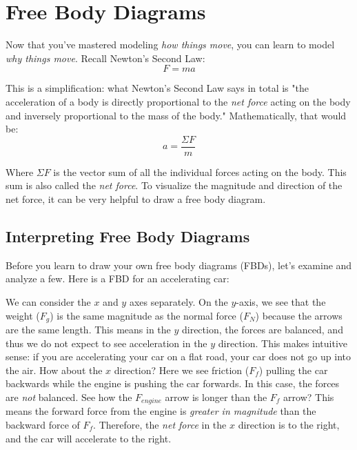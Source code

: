 \chapter{Free Body Diagrams}

Now that you've mastered modeling \textit{how things move}, you can learn to 
model \textit{why things move}. Recall Newton's Second Law:
$$F = ma$$

This is a simplification: what Newton's Second Law says in total is "the 
acceleration of a body is directly proportional to the \textit{net force} 
acting on the body and inversely proportional to the mass of the body." 
Mathematically, that would be:
$$a = \frac{\Sigma F}{m}$$

Where $\Sigma F$ is the vector sum of all the individual forces acting on the 
body. This sum is also called the \textit{net force}. To visualize the magnitude 
and direction of the net force, it can be very helpful to draw a free body 
diagram. 

\section{Interpreting Free Body Diagrams}
Before you learn to draw your own free body diagrams (FBDs), let's examine and 
analyze a few. Here is a FBD for an accelerating car:

\begin{center}
\end{center}

We can consider the $x$ and $y$ axes separately. On the $y$-axis, we see that 
the weight ($F_g$) is the same magnitude as the normal force ($F_N$) because the arrows are the same length. This 
means in the $y$ direction, the forces are balanced, and thus we do not expect 
to see acceleration in the $y$ direction. This makes intuitive sense: if you are 
accelerating your car on a flat road, your car does not go up into the air. How 
about the $x$ direction? Here we see friction ($F_f$) pulling the car backwards 
while the engine is pushing the car forwards. In this case, the forces are 
\textit{not} balanced. See how the $F_{engine}$ arrow is longer than the $F_f$ 
arrow? This means the forward force from the engine is \textit{greater in magnitude}
than the backward force of $F_f$. Therefore, the \textit{net force} in the $x$ 
direction is to the right, and the car will accelerate to the right. 


